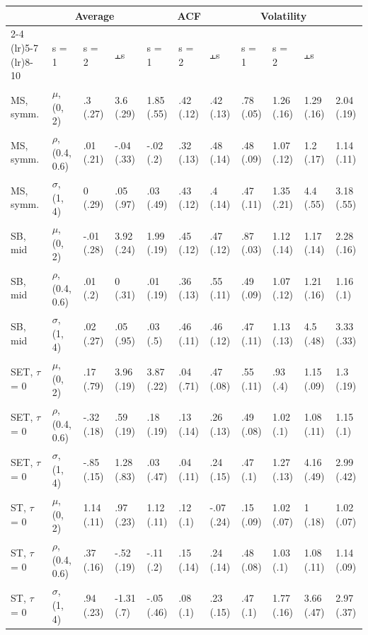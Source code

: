 \begin{table}[t]
\fontsize{12.0pt}{14.0pt}\selectfont
\begin{tabular*}{\linewidth}{@{\extracolsep{\fill}}l|llllllllll}
\toprule
 & \multicolumn{3}{c}{Average} & \multicolumn{3}{c}{ACF} & \multicolumn{3}{c}{Volatility} \\ 
\cmidrule(lr){2-4} \cmidrule(lr){5-7} \cmidrule(lr){8-10}
 & s = 1 & s = 2 & ⫠s & s = 1 & s = 2 & ⫠s & s = 1 & s = 2 & ⫠s \\ 
\midrule\addlinespace[2.5pt]
MS, symm. & \ensuremath{\mu}, (0, 2) & .3 (.27) & 3.6 (.29) & 1.85 (.55) & .42 (.12) & .42 (.13) & .78 (.05) & 1.26 (.16) & 1.29 (.16) & 2.04 (.19) \\ 
MS, symm. & \ensuremath{\rho}, (0.4, 0.6) & .01 (.21) & -.04 (.33) & -.02 (.2) & .32 (.13) & .48 (.14) & .48 (.09) & 1.07 (.12) & 1.2 (.17) & 1.14 (.11) \\ 
MS, symm. & \ensuremath{\sigma}, (1, 4) & 0 (.29) & .05 (.97) & .03 (.49) & .43 (.12) & .4 (.14) & .47 (.11) & 1.35 (.21) & 4.4 (.55) & 3.18 (.55) \\ 
SB, mid & \ensuremath{\mu}, (0, 2) & -.01 (.28) & 3.92 (.24) & 1.99 (.19) & .45 (.12) & .47 (.12) & .87 (.03) & 1.12 (.14) & 1.17 (.14) & 2.28 (.16) \\ 
SB, mid & \ensuremath{\rho}, (0.4, 0.6) & .01 (.2) & 0 (.31) & .01 (.19) & .36 (.13) & .55 (.11) & .49 (.09) & 1.07 (.12) & 1.21 (.16) & 1.16 (.1) \\ 
SB, mid & \ensuremath{\sigma}, (1, 4) & .02 (.27) & .05 (.95) & .03 (.5) & .46 (.11) & .46 (.12) & .47 (.11) & 1.13 (.13) & 4.5 (.48) & 3.33 (.33) \\ 
SET, \ensuremath{\tau} = 0 & \ensuremath{\mu}, (0, 2) & .17 (.79) & 3.96 (.19) & 3.87 (.22) & .04 (.71) & .47 (.08) & .55 (.11) & .93 (.4) & 1.15 (.09) & 1.3 (.19) \\ 
SET, \ensuremath{\tau} = 0 & \ensuremath{\rho}, (0.4, 0.6) & -.32 (.18) & .59 (.19) & .18 (.19) & .13 (.14) & .26 (.13) & .49 (.08) & 1.02 (.1) & 1.08 (.11) & 1.15 (.1) \\ 
SET, \ensuremath{\tau} = 0 & \ensuremath{\sigma}, (1, 4) & -.85 (.15) & 1.28 (.83) & .03 (.47) & .04 (.11) & .24 (.15) & .47 (.1) & 1.27 (.13) & 4.16 (.49) & 2.99 (.42) \\ 
ST, \ensuremath{\tau} = 0 & \ensuremath{\mu}, (0, 2) & 1.14 (.11) & .97 (.23) & 1.12 (.11) & .12 (.1) & -.07 (.24) & .15 (.09) & 1.02 (.07) & 1 (.18) & 1.02 (.07) \\ 
ST, \ensuremath{\tau} = 0 & \ensuremath{\rho}, (0.4, 0.6) & .37 (.16) & -.52 (.19) & -.11 (.2) & .15 (.14) & .24 (.14) & .48 (.08) & 1.03 (.1) & 1.08 (.11) & 1.14 (.09) \\ 
ST, \ensuremath{\tau} = 0 & \ensuremath{\sigma}, (1, 4) & .94 (.23) & -1.31 (.7) & -.05 (.46) & .08 (.1) & .23 (.15) & .47 (.1) & 1.77 (.16) & 3.66 (.47) & 2.97 (.37) \\ 
\bottomrule
\end{tabular*}
\end{table}

